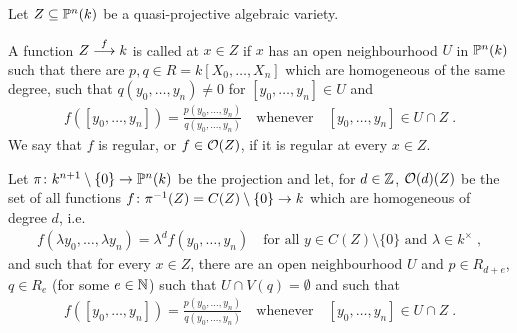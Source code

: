 \documentclass[a4paper,parskip=half,numbers=enddot, DIV=12]{scrreprt}
\begin{document}
\begin{defi}
    Let $Z\subseteq\mathbb{P}^n(k)$ be a quasi-projective algebraic variety. 
    \begin{alphanumerate}
    	\item A function $Z\morphism[f] k$ is called  at $x\in Z$ if $x$ has an open neighbourhood $U$ in $\mathbb{P}^n(k)$ such that there are $p,q\in R = k[X_0,\ldots,X_n]$ which are homogeneous of the same degree, such that $q(y_0,\ldots,y_n) \neq 0$ for $[y_0,\ldots,y_n]\in U$ and
    	\begin{align*}
	    	f([y_0,\ldots,y_n]) = \frac{p(y_0,\ldots,y_n)}{q(y_0,\ldots,y_n)}\quad\text{whenever}\quad[y_0,\ldots, y_n]\in U\cap Z\;.
    	\end{align*}
    	We say that $f$ is regular, or $f\in \mathcal{O}(Z)$, if it is regular at every $x\in Z$.
    	\item  Let $\pi\colon k^{n+1}\setminus \{0\} \morphism \IP^n(k)$ be the projection and let, for $d\in \mathbb{Z}$, $\mathcal{O}(d)(Z)$ be the set of all functions $f\colon \pi^{-1}(Z) = C(Z)\setminus\{0\}\morphism k$ which are homogeneous of degree $d$, i.e.
    	\begin{align*}
	    	f(\lambda y_0,\ldots, \lambda y_n) = \lambda^d f(y_0,\ldots, y_n)\quad \text{for all }y\in C(Z)\setminus\{0\}\text{ and }\lambda \in k^\times\;, 
    	\end{align*}
    	and such that for every $x\in Z$, there are an open neighbourhood $U$ and $p\in R_{d+e}$, $q\in R_e$ (for some $e\in \mathbb{N}$) such that $U\cap V(q) = \emptyset$ and such that 
    	\begin{align*}
	    	f([y_0,\ldots, y_n]) = \frac{p(y_0,\ldots, y_n)}{q(y_0,\ldots, y_n)}\quad\text{whenever}\quad[y_0,\ldots, y_n]\in U\cap Z\;. 
    	\end{align*}
    \end{alphanumerate}
    
    
\end{defi}
\end{document}
